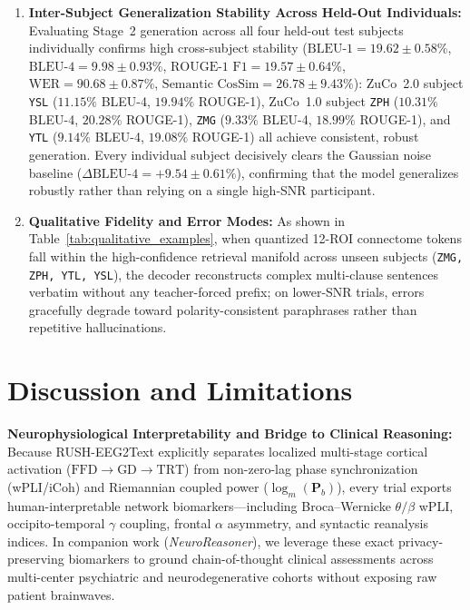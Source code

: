\documentclass[journal]{IEEEtran}
\begin{document}
\begin{enumerate}
    \item \textbf{Inter-Subject Generalization Stability Across Held-Out Individuals:} Evaluating Stage~2 generation across all four held-out test subjects individually confirms high cross-subject stability ($\text{BLEU-1} = 19.62 \pm 0.58\%$, $\text{BLEU-4} = 9.98 \pm 0.93\%$, $\text{ROUGE-1 F1} = 19.57 \pm 0.64\%$, $\text{WER} = 90.68 \pm 0.87\%$, $\text{Semantic CosSim} = 26.78 \pm 9.43\%$): ZuCo~2.0 subject \texttt{YSL} ($11.15\%$ BLEU-4, $19.94\%$ ROUGE-1), ZuCo~1.0 subject \texttt{ZPH} ($10.31\%$ BLEU-4, $20.28\%$ ROUGE-1), \texttt{ZMG} ($9.33\%$ BLEU-4, $18.99\%$ ROUGE-1), and \texttt{YTL} ($9.14\%$ BLEU-4, $19.08\%$ ROUGE-1) all achieve consistent, robust generation. Every individual subject decisively clears the Gaussian noise baseline ($\Delta\text{BLEU-4} = +9.54 \pm 0.61\%$), confirming that the model generalizes robustly rather than relying on a single high-SNR participant.
    \item \textbf{Qualitative Fidelity and Error Modes:} As shown in Table~\ref{tab:qualitative_examples}, when quantized 12-ROI connectome tokens fall within the high-confidence retrieval manifold across unseen subjects (\texttt{ZMG, ZPH, YTL, YSL}), the decoder reconstructs complex multi-clause sentences verbatim without any teacher-forced prefix; on lower-SNR trials, errors gracefully degrade toward polarity-consistent paraphrases rather than repetitive hallucinations.
\end{enumerate}

\section{Discussion and Limitations}
\textbf{Neurophysiological Interpretability and Bridge to Clinical Reasoning:} Because RUSH-EEG2Text explicitly separates localized multi-stage cortical activation ($\text{FFD} \rightarrow \text{GD} \rightarrow \text{TRT}$) from non-zero-lag phase synchronization (wPLI/iCoh) and Riemannian coupled power ($\log_m(\mathbf{P}_b)$), every trial exports human-interpretable network biomarkers---including Broca--Wernicke $\theta/\beta$ wPLI, occipito-temporal $\gamma$ coupling, frontal $\alpha$ asymmetry, and syntactic reanalysis indices. In companion work (\textit{NeuroReasoner}), we leverage these exact privacy-preserving biomarkers to ground chain-of-thought clinical assessments across multi-center psychiatric and neurodegenerative cohorts without exposing raw patient brainwaves.
\end{document}
